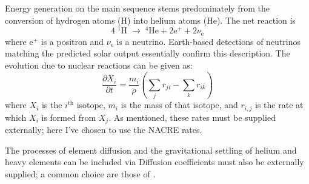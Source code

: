 \begin{description}
    \setlength{\itemindent}{0pt}
    \item[Nuclear reactions.] Energy generation on the main sequence stems predominately from the conversion of hydrogen atoms (H) into helium atoms (He). 
    The net reaction is 
    \begin{equation}
        4\;^1\text{H}\; \rightarrow\; ^4\text{He} + 2\text{e}^+ + 2\nu_{\text{e}}
    \end{equation}
    where e$^+$ is a positron and $\nu_{\text{e}}$ is a neutrino. 
    Earth-based detections of neutrinos matching the predicted solar output essentially confirm this description. 
    The evolution due to nuclear reactions can be given as: 
    \begin{equation} \boxed{
        \frac{\partial X_i}{\partial t}
        =
        \frac{m_i}{\rho}
        \left( 
            \sum_j r_{ji}
            -
            \sum_k r_{ik}
        \right)
    }\end{equation}
    where $X_i$ is the $i^{\text{th}}$ isotope, $m_i$ is the mass of that isotope, and $r_{i,j}$ is the rate at which $X_i$ is formed from $X_j$. 
    As mentioned, these rates must be supplied externally; here I've chosen to use the \textsc{NACRE} rates. 
    
    \item[Diffusion.] The processes of element diffusion and the gravitational settling of helium and heavy elements can be included via  
    Diffusion coefficients must also be externally supplied; a common choice are those of \citealt{1994ApJ...421..828T}.
    

\end{description}

